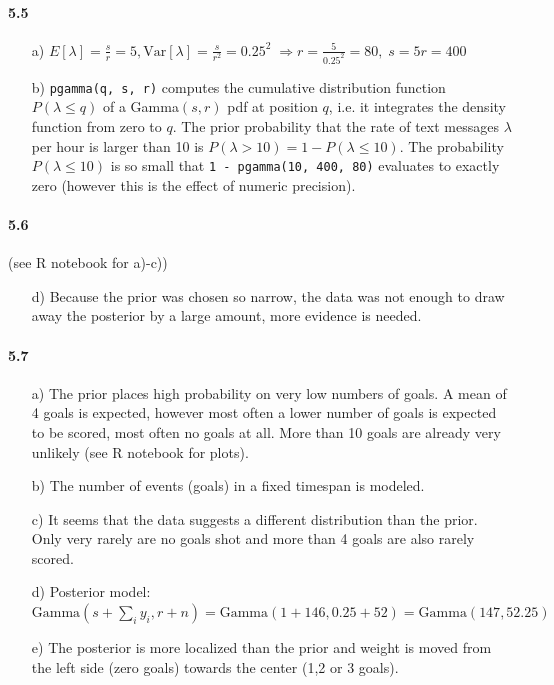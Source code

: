 \documentclass[fontsize=11pt,DIV=18,parskip=half]{scrartcl}
\begin{document}
\paragraph{5.5}

\begin{enumerate}
\item[a)] $E[\lambda] = \frac{s}{r} = 5, \text{Var}[\lambda] = \frac{s}{r^2} = 0.25^2\; \Rightarrow r = \frac{5}{0.25^2} = 80, \; s = 5r = 400$
\item[b)] \texttt{pgamma(q, s, r)} computes the cumulative distribution function $P(\lambda \leq q)$ of a Gamma$(s, r)$ pdf at position $q$, i.e. it integrates the density function from zero to $q$. The prior probability that the rate of text messages $\lambda$ per hour is larger than 10 is $P(\lambda > 10) = 1 - P(\lambda \leq 10)$. The probability $P(\lambda \leq 10)$ is so small that \texttt{1 - pgamma(10, 400, 80)} evaluates to exactly zero (however this is the effect of numeric precision).
\end{enumerate}

\paragraph{5.6} (see R notebook for a)-c))

\begin{enumerate}
\item[d)] Because the prior was chosen so narrow, the data was not enough to draw away the posterior by a large amount, more evidence is needed.
\end{enumerate}

\paragraph{5.7}

\begin{enumerate}
\item[a)] The prior places high probability on very low numbers of goals. A mean of 4 goals is expected, however most often a lower number of goals is expected to be scored, most often no goals at all. More than 10 goals are already very unlikely (see R notebook for plots).
\item[b)] The number of events (goals) in a fixed timespan is modeled.
\item[c)] It seems that the data suggests a different distribution than the prior. Only very rarely are no goals shot and more than 4 goals are also rarely scored.
\item[d)] Posterior model: $\text{Gamma}(s + \sum_i y_i, r+n) = \text{Gamma}(1 + 146, 0.25+52) = \text{Gamma}(147, 52.25)$
\item[e)] The posterior is more localized than the prior and weight is moved from the left side (zero goals) towards the center (1,2 or 3 goals).
\end{enumerate}
\end{document}
